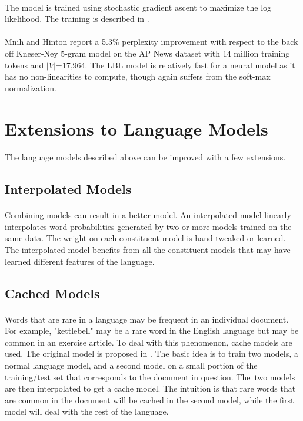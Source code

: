 \paragraph{}
The model is trained using stochastic gradient ascent to maximize the log likelihood. The training is described in \cite{MnihHinton2007}.
\paragraph{}
Mnih and Hinton report a 5.3\% perplexity improvement with respect to the back off Kneser-Ney 5-gram model on the AP News dataset with 14 million training tokens and $|V|$=17,964. The LBL model is relatively fast for a neural model as it has no non-linearities to compute, though again suffers from the soft-max normalization. 

\section {Extensions to Language Models}
\paragraph{}
The language models described above can be improved with a few extensions.

\subsection{Interpolated Models}
\paragraph{}
Combining models can result in a better model. An interpolated model linearly interpolates word probabilities generated by two or more models trained on the same data. The weight on each constituent model is hand-tweaked or learned. The interpolated model benefits from all the constituent models that may have learned different features of the language.
\subsection{Cached Models}
\paragraph{}
Words that are rare in a language may be frequent in an individual document. For example, "kettlebell" may be a rare word in the English language but may be common in an exercise article. To deal with this phenomenon, cache models are used. The original model is proposed in \cite{Kuhn1990}. The basic idea is to train two models, a normal language model, and a second model on a small portion of the training/test set that corresponds to the document in question. The~two models are then interpolated to get a cache model. The intuition is that rare words that are common in the document will be cached in the second model, while the first model will deal with the rest of the language.


